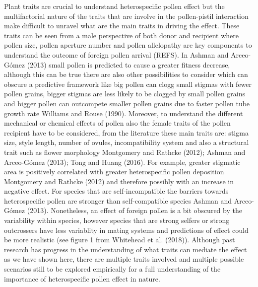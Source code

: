 \documentclass[11pt,a4paper]{article}
\begin{document}
Plant traits are crucial to understand heterospecific pollen effect but
the multifactorial nature of the traits that are involve in the
pollen-pistil interaction make difficult to unravel what are the main
traits in driving the effect. These traits can be seen from a male
perspective of both donor and recipient where pollen size, pollen
aperture number and pollen allelopathy are key components to understand
the outcome of foreign pollen arrival (REFS). In Ashman and Arceo-Gómez
(2013) small pollen is predicted to cause a greater fitness decrease,
although this can be true there are also other possibilities to consider
which can obscure a predictive framework like big pollen can clogg small
stigmas with fewer pollen grains, bigger stigmas are less likely to be
clogged by small pollen grains and bigger pollen can outcompete smaller
pollen grains due to faster pollen tube growth rate Williams and Rouse
(1990). Moreover, to understand the different mechanical or chemical
effects of pollen also the female traits of the pollen recipient have to
be considered, from the literature these main traits are: stigma size,
style length, number of ovules, incompatibility system and also a
structural trait such as flower morphology Montgomery and Rathcke
(2012); Ashman and Arceo-Gómez (2013); Tong and Huang (2016). For
example, greater stigmatic area is positively correlated with greater
heterospecific pollen deposition Montgomery and Rathcke (2012) and
therefore possibly with an increase in negative effect. For species that
are self-incompatible the barriers towards heterospecific pollen are
stronger than self-compatible species Ashman and Arceo-Gómez (2013).
Nonetheless, an effect of foreign pollen is a bit obscured by the
variability within species, however species that are strong selfers or
strong outcrossers have less variablity in mating systems and
predictions of effect could be more realistic (see figure 1 from
Whitehead et al. (2018)). Although past research has progress in the
understanding of what traits can mediate the effect as we have shown
here, there are multiple traits involved and multiple possible scenarios
still to be explored empirically for a full understanding of the
importance of heterospecific pollen effect in nature.
\end{document}
